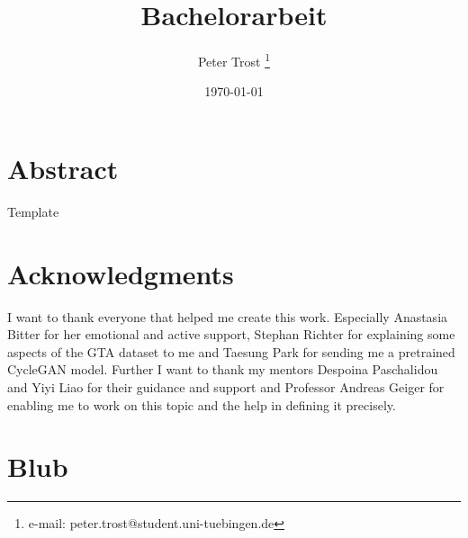 \documentclass[a4paper,cleardoubleempty,BCOR1cm]{scrbook}
\title{Bachelorarbeit}
\author{Peter Trost \thanks{e-mail: peter.trost@student.uni-tuebingen.de}}
\date{\today}
\begin{document}


\chapter*{Abstract}
Template

\chapter*{Acknowledgments}
I want to thank everyone that helped me create this work. Especially Anastasia Bitter for her emotional and active support, Stephan Richter for explaining some aspects of the GTA dataset to me and Taesung Park for sending me a pretrained CycleGAN model. Further I want to thank my mentors Despoina Paschalidou and Yiyi Liao for their guidance and support and Professor Andreas Geiger for enabling me to work on this topic and the help in defining it precisely.

\tableofcontents











\appendix
\chapter{Blub}



\end{document}
